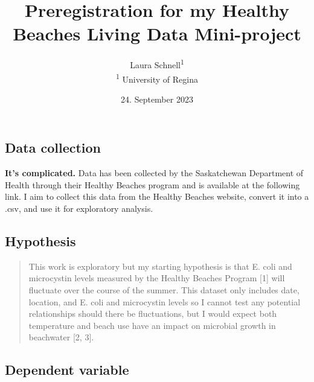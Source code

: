 \documentclass[]{article}
\title{Preregistration for my Healthy Beaches Living Data Mini-project}
\author{
          Laura Schnell\textsuperscript{1}          \\ \vspace{0.5cm}
              \textsuperscript{1} University of Regina      }
\date{24. September 2023}
\newcounter{question}
\begin{document}
\maketitle
\vspace{2pc}


\ifPDFTeX
  \newcommand\Question[2]{%
   \leavevmode\par
   \stepcounter{question}
   \noindent
   \textbf{\thequestion. #1}. #2\par}
\else %
  \NewCommandCopy{\oldQuestion}{\Question}
  \renewcommand\Question[2]{%
   \leavevmode\par
   \stepcounter{question}
   \noindent
   \textbf{\thequestion. #1}. #2\par}
\fi



\newcommand\Answer[1]{%
    \noindent
    \textit{Registered response}: #1\par}

\hypertarget{data-collection}{%
\subsection{Data collection}\label{data-collection}}

\textbf{It's complicated.} Data has been collected by the Saskatchewan
Department of Health through their Healthy Beaches program and is
available at the following link. I aim to collect this data from the
Healthy Beaches website, convert it into a .csv, and use it for
exploratory analysis.

\hypertarget{hypothesis}{%
\subsection{Hypothesis}\label{hypothesis}}

\begin{quote}
This work is exploratory but my starting hypothesis is that E. coli and
microcystin levels measured by the Healthy Beaches Program {[}1{]} will
fluctuate over the course of the summer. This dataset only includes
date, location, and E. coli and microcystin levels so I cannot test any
potential relationships should there be fluctuations, but I would expect
both temperature and beach use have an impact on microbial growth in
beachwater {[}2, 3{]}.
\end{quote}

\hypertarget{dependent-variable}{%
\subsection{Dependent variable}\label{dependent-variable}}
\end{document}

